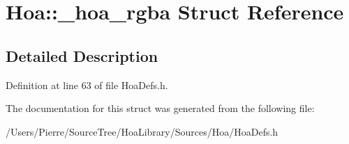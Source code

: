 \hypertarget{struct_hoa_1_1__hoa__rgba}{\section{Hoa\-:\-:\-\_\-hoa\-\_\-rgba Struct Reference}
\label{struct_hoa_1_1__hoa__rgba}
}


\subsection{Detailed Description}


Definition at line 63 of file Hoa\-Defs.\-h.



The documentation for this struct was generated from the following file\-:\begin{DoxyCompactItemize}
\item 
/\-Users/\-Pierre/\-Source\-Tree/\-Hoa\-Library/\-Sources/\-Hoa/Hoa\-Defs.\-h\end{DoxyCompactItemize}

